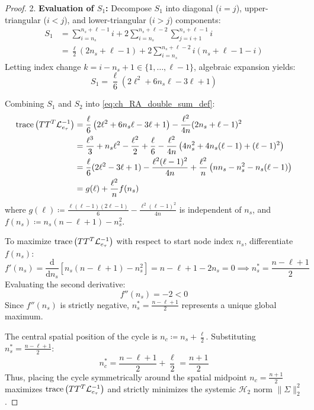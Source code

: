 \begin{proof}
2. \textbf{Evaluation of $S_1$:} Decompose $S_1$ into diagonal ($i=j$), upper-triangular ($i < j$), and lower-triangular ($i > j$) components:
\begin{align}
	S_1 &= \sum_{i=n_s}^{n_s+\ell-1} i + 2 \sum_{i=n_s}^{n_s+\ell-2} \sum_{j=i+1}^{n_s+\ell-1} i \nonumber \\
	&= \frac{\ell}{2}(2n_s + \ell - 1) + 2 \sum_{i=n_s}^{n_s+\ell-2} i (n_s + \ell - 1 - i)
\end{align}
Letting index change $k = i - n_s + 1 \in \{1, \dots, \ell-1\}$, algebraic expansion yields:
\begin{equation}\label{eq:ch_RA_S1_eval}
	S_1 = \frac{\ell}{6} \left( 2\ell^2 + 6n_s \ell - 3\ell + 1 \right)
\end{equation}

Combining $S_1$ and $S_2$ into \eqref{eq:ch_RA_double_sum_def}:
\begin{align}\label{eq:ch_RA_TTT_expansion_full}
	\text{trace}\left( T T^T \mathcal{L}_{e_{\tau}}^{-1} \right) &= \frac{\ell}{6} \left( 2\ell^2 + 6n_s \ell - 3\ell + 1 \right) - \frac{\ell^2}{4n} (2n_s + \ell - 1)^2 \nonumber \\
	&= \frac{\ell^3}{3} + n_s \ell^2 - \frac{\ell^2}{2} + \frac{\ell}{6} - \frac{\ell^2}{4n} \left( 4n_s^2 + 4n_s(\ell-1) + (\ell-1)^2 \right) \nonumber \\
	&= \frac{\ell}{6}(2\ell^2 - 3\ell + 1) - \frac{\ell^2(\ell-1)^2}{4n} + \frac{\ell^2}{n} \left( n n_s - n_s^2 - n_s(\ell-1) \right) \nonumber \\
	&= g(\ell) + \frac{\ell^2}{n} f(n_s)
\end{align}
where $g(\ell) \coloneqq \frac{\ell(\ell-1)(2\ell-1)}{6} - \frac{\ell^2(\ell-1)^2}{4n}$ is independent of $n_s$, and $f(n_s) \coloneqq n_s(n - \ell + 1) - n_s^2$.

To maximize $\text{trace}\left( T T^T \mathcal{L}_{e_{\tau}}^{-1} \right)$ with respect to start node index $n_s$, differentiate $f(n_s)$:
\begin{equation}
	f'(n_s) = \frac{\mathrm{d}}{\mathrm{d}n_s} \left[ n_s(n - \ell + 1) - n_s^2 \right] = n - \ell + 1 - 2n_s = 0 \implies n_s^* = \frac{n - \ell + 1}{2}
\end{equation}
Evaluating the second derivative:
\begin{equation}
	f''(n_s) = -2 < 0
\end{equation}
Since $f''(n_s)$ is strictly negative, $n_s^* = \frac{n - \ell + 1}{2}$ represents a unique global maximum.

The central spatial position of the cycle is $n_c \coloneqq n_s + \frac{\ell}{2}$. Substituting $n_s^* = \frac{n - \ell + 1}{2}$:
\begin{equation}
	n_c^* = \frac{n - \ell + 1}{2} + \frac{\ell}{2} = \frac{n + 1}{2}
\end{equation}
Thus, placing the cycle symmetrically around the spatial midpoint $n_c = \frac{n+1}{2}$ maximizes $\text{trace}\left( T T^T \mathcal{L}_{e_{\tau}}^{-1} \right)$ and strictly minimizes the systemic $\mathcal{H}_2$ norm $\|\Sigma\|_2^2$.
\end{proof}

